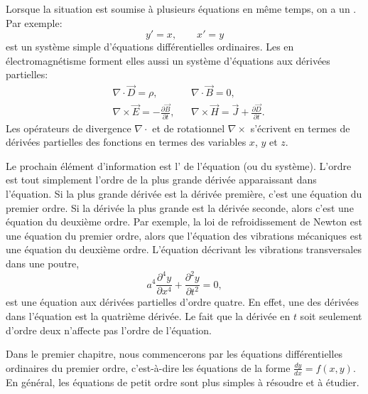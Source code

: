 Lorsque la situation est soumise à plusieurs équations en même temps, on a un
\emph{}.
Par exemple:
\begin{equation*}
	y' = x , \qquad x' = y
\end{equation*}
est un système simple d'équations différentielles ordinaires.
Les  en électromagnétisme forment elles aussi un système d'équations aux dérivées partielles:
\begin{align*}
	& \nabla \cdot \vec{D} = \rho, & & \nabla \cdot \vec{B} = 0,  \\
	& \nabla \times \vec{E} = - \frac{\partial \vec{B}}{\partial t}, &
	& \nabla \times \vec{H} = \vec{J} + \frac{\partial \vec{D}}{\partial t} .
\end{align*}
Les opérateurs de divergence $\nabla \cdot$ et de rotationnel $\nabla \times$
s'écrivent en termes de dérivées partielles des fonctions en termes des variables $x$, $y$ et $z$.

\medskip

Le prochain élément d'information est l'\emph{} de l'équation (ou du système).
L'ordre est tout simplement l'ordre de la plus grande dérivée apparaissant dans l'équation.
Si la plus grande dérivée est la dérivée première, c'est une équation du premier ordre.
Si la dérivée la plus grande est la dérivée seconde, alors c'est une équation du deuxième ordre.
Par exemple, la loi de refroidissement de Newton est une équation du premier ordre,
alors que l'équation des vibrations mécaniques est une équation du deuxième ordre.
L'équation décrivant les vibrations transversales dans une poutre,
\begin{equation*}
	a^4 \frac{\partial^4 y}{\partial x^4} + \frac{\partial^2 y}{\partial t^2} = 0,
\end{equation*}
est une équation aux dérivées partielles d'ordre quatre.
En effet, une des dérivées dans l'équation est la quatrième dérivée.
Le fait que la dérivée en $t$ soit seulement d'ordre deux n'affecte pas l'ordre de l'équation.

Dans le premier chapitre, nous commencerons par les équations différentielles ordinaires du premier ordre,
c'est-à-dire les équations de la forme $\frac{dy}{dx} = f(x,y)$.
En général, les équations de petit ordre sont plus simples à résoudre et à étudier.

\medskip


